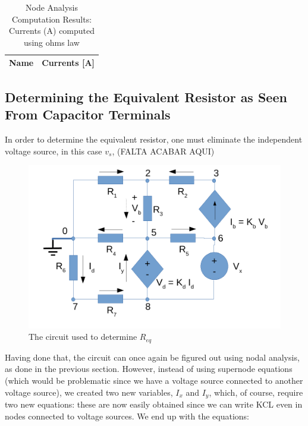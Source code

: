 \begin{table}[h]
  \centering
  \begin{tabular}{|l|r|}
    \hline    
    {\bf Name} & {\bf Currents [A]} \\ \hline
    
  \end{tabular}
  \caption{Node Analysis Computation Results: Currents (A) computed using ohms law}
  \label{tab:nodeCurrents1}
\end{table}




\newpage

\subsection{Determining the Equivalent Resistor as Seen From Capacitor Terminals}

In order to determine the equivalent resistor, one must eliminate the independent voltage source, in this case $v_s$, (FALTA ACABAR AQUI)

\begin{figure}[h] \centering
\includegraphics[width=0.5\linewidth]{t2-t2.pdf}
\caption{The circuit used to determine $R_{eq}$}
\label{fig3}
\end{figure}

Having done that, the circuit can once again be figured out using nodal analysis, as done in the previous section. However, instead of using supernode equations
(which would be problematic since we have a voltage source connected to another voltage source), we created two new variables, $I_x$ and $I_y$, which, of course,
require two new equations: these are now easily obtained since we can write KCL even in nodes connected to voltage sources. We end up with the equations:

